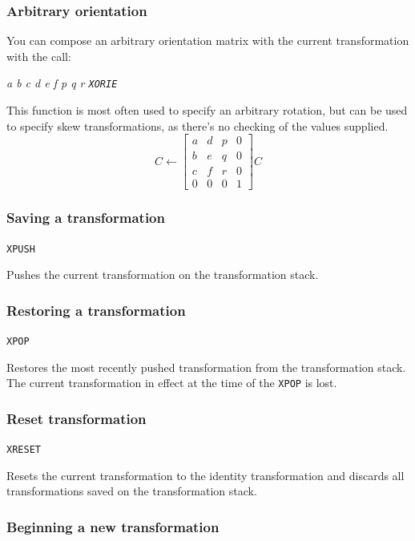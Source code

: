 \documentclass{article}
\begin{document}
\subsubsection{Arbitrary orientation}

You can compose an arbitrary orientation matrix with the current
transformation with the call:

{\em a b c d e f p q r {\tt XORIE}}

This function is most often used to specify an arbitrary rotation, but
can be used to specify skew transformations, as there's no checking of
the values supplied.
\[ C \leftarrow \left[ \begin{array}{cccc}
        a & d & p & 0 \\
        b & e & q & 0 \\
        c & f & r & 0 \\
        0 & 0 & 0 & 1
\end{array} \right] C \]

\subsubsection{Saving a transformation}

{\tt XPUSH}

Pushes the current transformation on the transformation stack.

\subsubsection{Restoring a transformation}

{\tt XPOP}

Restores the most recently pushed transformation from the
transformation stack.  The current transformation in effect at the
time of the {\tt XPOP} is lost.

\subsubsection{Reset transformation}

{\tt XRESET}

Resets the current transformation to the identity transformation and
discards all transformations saved on the transformation stack.

\subsubsection{Beginning a new transformation}
\end{document}
